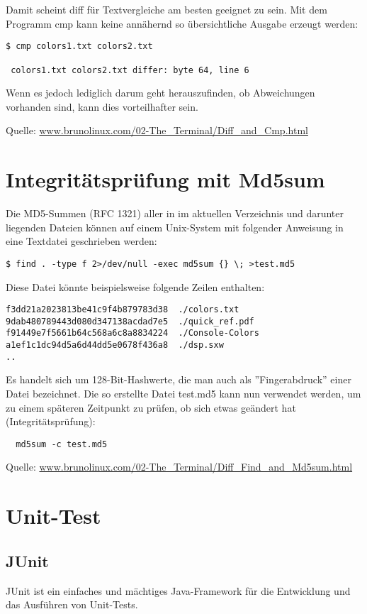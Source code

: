 \newslide
Damit scheint diff für Textvergleiche am besten geeignet zu sein.
Mit dem Programm cmp kann keine annähernd so übersichtliche
Ausgabe erzeugt werden:
\begin{lstlisting}
$ cmp colors1.txt colors2.txt

 colors1.txt colors2.txt differ: byte 64, line 6
\end{lstlisting}
Wenn es jedoch lediglich darum geht herauszufinden, ob
Abweichungen vorhanden sind, kann dies vorteilhafter sein.

Quelle:
\href{http://www.brunolinux.com/02-The_Terminal/Diff_and_Cmp.html}
{www.brunolinux.com/02-The\_Terminal/Diff\_and\_Cmp.html}
\newslide
\section{Integritätsprüfung mit Md5sum}
Die MD5-Summen (RFC 1321)
aller in im aktuellen Verzeichnis und darunter
liegenden Dateien können auf einem Unix-System mit folgender Anweisung
in eine Textdatei geschrieben werden:
\begin{lstlisting}
$ find . -type f 2>/dev/null -exec md5sum {} \; >test.md5
\end{lstlisting}
Diese Datei könnte beispielsweise folgende Zeilen enthalten:
\begin{lstlisting}
f3dd21a2023813be41c9f4b879783d38  ./colors.txt
9dab480789443d080d347138acdad7e5  ./quick_ref.pdf
f91449e7f5661b64c568a6c8a8834224  ./Console-Colors
a1ef1c1dc94d5a6d44dd5e0678f436a8  ./dsp.sxw
..
\end{lstlisting}
\newslide
Es handelt sich um 128-Bit-Hashwerte, die man auch als
''Fingerabdruck'' einer Datei bezeichnet.
Die so erstellte Datei test.md5 kann nun verwendet werden,
um zu einem späteren Zeitpunkt
zu prüfen, ob sich etwas geändert hat (Integritätsprüfung):
\begin{lstlisting}
  md5sum -c test.md5
\end{lstlisting}
Quelle: \href{http://www.brunolinux.com/02-The_Terminal/Diff_Find_and_Md5sum.html}
  {www.brunolinux.com/02-The\_Terminal/Diff\_Find\_and\_Md5sum.html}
%
\newslide
\section{Unit-Test}
\subsection{JUnit}
JUnit ist ein einfaches und mächtiges Java-Framework für die
Entwicklung und das Ausführen von Unit-Tests.

